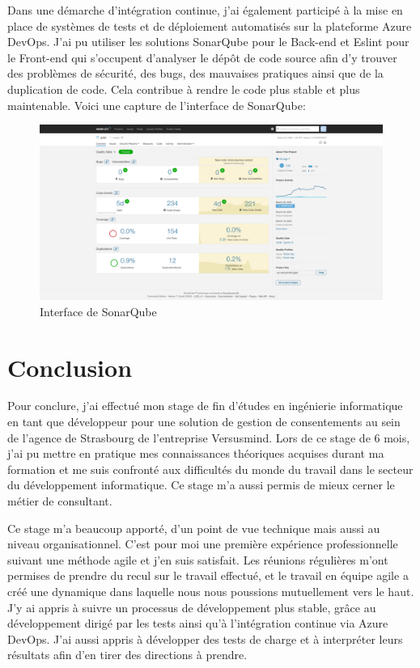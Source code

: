 \documentclass[12pt, a4paper]{report}
\begin{document}
Dans une démarche d'intégration continue, j'ai également participé à la mise en place de systèmes de tests et de déploiement automatisés sur la plateforme Azure DevOps.\newline
J'ai pu utiliser les solutions SonarQube pour le Back-end et Eslint pour le Front-end qui s'occupent d'analyser le dépôt de code source afin d'y trouver des problèmes de sécurité, des bugs, des mauvaises pratiques ainsi que de la duplication de code.\newline
Cela contribue à rendre le code plus stable et plus maintenable.\newline
Voici une capture de l'interface de SonarQube:
\begin{figure}[H]
    \begin{center}
        \includegraphics[width=0.5\linewidth]{sonarqube.png}
    \end{center}
    \caption{Interface de SonarQube}
\end{figure}
\chapter{Conclusion}
Pour conclure, j'ai effectué mon stage de fin d'études en ingénierie informatique en tant que développeur pour une solution de gestion de consentements au sein de l'agence de Strasbourg de l'entreprise Versusmind.\newline
Lors de ce stage de 6 mois, j'ai pu mettre en pratique mes connaissances théoriques acquises durant ma formation et me suis confronté aux difficultés du monde du travail dans le secteur du développement informatique.
Ce stage m'a aussi permis de mieux cerner le métier de consultant.\newline

Ce stage m'a beaucoup apporté, d'un point de vue technique mais aussi au niveau organisationnel.\newline
C'est pour moi une première expérience professionnelle suivant une méthode agile et j'en suis satisfait.
Les réunions régulières m'ont permises de prendre du recul sur le travail effectué, et le travail en équipe agile a créé une dynamique dans laquelle nous nous poussions mutuellement vers le haut.\newline
J'y ai appris à suivre un processus de développement plus stable, grâce au développement dirigé par les tests ainsi qu'à l'intégration continue via Azure DevOps.\newline
J'ai aussi appris à développer des tests de charge et à interpréter leurs résultats afin d'en tirer des directions à prendre.\newline
\end{document}
